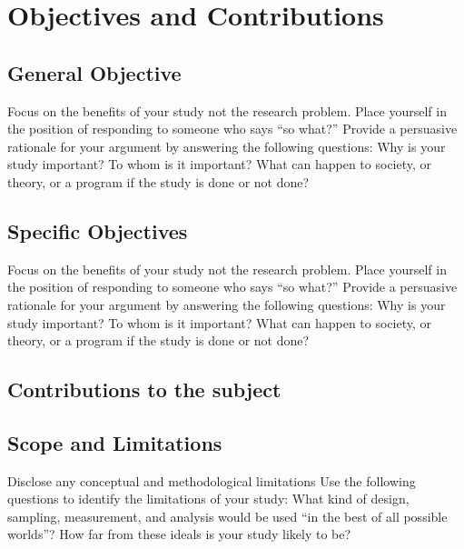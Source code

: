 \chapter{Objectives and Contributions}
\section{General Objective}
Focus on the benefits of your study not the research problem.
Place yourself in the position of responding to someone who says “so what?” Provide a persuasive rationale for your argument by answering the following questions: Why is your study important? To whom is it important? What can happen to society, or theory, or a program if the study is done or not done?

\section{Specific Objectives}
Focus on the benefits of your study not the research problem.
Place yourself in the position of responding to someone who says “so what?” Provide a persuasive rationale for your argument by answering the following questions: Why is your study important? To whom is it important? What can happen to society, or theory, or a program if the study is done or not done?

\section{Contributions to the subject}

\section{Scope and Limitations}
Disclose any conceptual and methodological limitations
Use the following questions to identify the limitations of your study: What kind of design, sampling, measurement, and analysis would be used “in the best of all possible worlds”? How far from these ideals is your study likely to be?